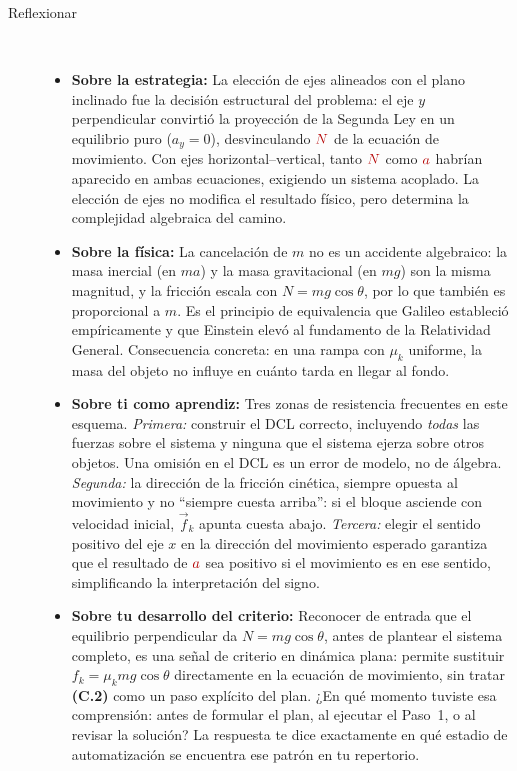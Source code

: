 \documentclass[11pt]{book}
\newcommand{\incog}[1]{\textcolor{colIncog}{#1}}
\begin{document}
\begin{enumerate}
\begin{description}
\item[Reflexionar]~
\begin{itemize}
    \item \textbf{Sobre la estrategia:} La elección de ejes alineados con el plano inclinado fue la decisión estructural del problema: el eje $y$ perpendicular convirtió la proyección de la Segunda Ley en un equilibrio puro ($a_y = 0$), desvinculando $\incog{N}$ de la ecuación de movimiento. Con ejes horizontal--vertical, tanto $\incog{N}$ como $\incog{a}$ habrían aparecido en ambas ecuaciones, exigiendo un sistema acoplado. La elección de ejes no modifica el resultado físico, pero determina la complejidad algebraica del camino.

    \item \textbf{Sobre la física:} La cancelación de $m$ no es un accidente algebraico: la masa inercial (en $ma$) y la masa gravitacional (en $mg$) son la misma magnitud, y la fricción escala con $N = mg\cos\theta$, por lo que también es proporcional a $m$. Es el principio de equivalencia que Galileo estableció empíricamente y que Einstein elevó al fundamento de la Relatividad General. Consecuencia concreta: en una rampa con $\mu_k$ uniforme, la masa del objeto no influye en cuánto tarda en llegar al fondo.

    \item \textbf{Sobre ti como aprendiz:} Tres zonas de resistencia frecuentes en este esquema. \textit{Primera:} construir el DCL correcto, incluyendo {\it todas} las fuerzas sobre el sistema y ninguna que el sistema ejerza sobre otros objetos. Una omisión en el DCL es un error de modelo, no de álgebra. \textit{Segunda:} la dirección de la fricción cinética, siempre opuesta al movimiento y no ``siempre cuesta arriba'': si el bloque asciende con velocidad inicial, $\vec{f}_k$ apunta cuesta abajo. \textit{Tercera:} elegir el sentido positivo del eje $x$ en la dirección del movimiento esperado garantiza que el resultado de $\incog{a}$ sea positivo si el movimiento es en ese sentido, simplificando la interpretación del signo.

    \item \textbf{Sobre tu desarrollo del criterio:} Reconocer de entrada que el equilibrio perpendicular da $N = mg\cos\theta$, antes de plantear el sistema completo, es una señal de criterio en dinámica plana: permite sustituir $f_k = \mu_k mg\cos\theta$ directamente en la ecuación de movimiento, sin tratar \textbf{(C.2)} como un paso explícito del plan. ¿En qué momento tuviste esa comprensión: antes de formular el plan, al ejecutar el Paso~1, o al revisar la solución? La respuesta te dice exactamente en qué estadio de automatización se encuentra ese patrón en tu repertorio.
\end{itemize}


\end{description}
\end{enumerate}
\end{document}

